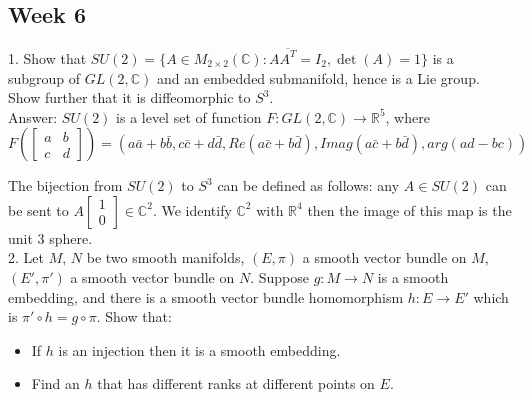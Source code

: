 \documentclass{article}
\theoremstyle{definition}
\begin{document}
\newpage

\subsection{Week 6}

1. Show that $SU(2)=\{A\in M_{2\times 2}(\mathbb{C}): A\overline{A^T}=I_2, \det(A)=1\}$ is a subgroup of $GL(2, \mathbb{C})$ and an embedded submanifold, hence is a Lie group. Show further that it is diffeomorphic to $S^3$.\\

Answer: $SU(2)$ is a level set of function $F: GL(2, \mathbb{C})\rightarrow \mathbb{R}^5$, where \[F(\left[\begin{array}{cc}a & b\\ c & d\end{array}\right])=(a\bar{a}+b\bar{b}, c\bar{c}+d\bar{d}, Re(a\bar{c}+b\bar{d}), Imag(a\bar{c}+b\bar{d}), arg(ad-bc))\]

The bijection from $SU(2)$ to $S^3$ can be defined as follows: any $A\in SU(2)$ can be sent to $A\left[\begin{array}{c}1\\0\end{array}\right]\in \mathbb{C}^2$. We identify $\mathbb{C}^2$ with $\mathbb{R}^4$ then the image of this map is the unit $3$ sphere.\\

2. Let $M$, $N$ be two smooth manifolds, $(E, \pi)$ a smooth vector bundle on $M$, $(E', \pi')$ a smooth vector bundle on $N$. Suppose $g: M\rightarrow N$ is a smooth embedding, and there is a smooth vector bundle homomorphism $h: E\rightarrow E'$ which is $\pi'\circ h=g\circ \pi$. Show that:

\begin{itemize}
    \item If $h$ is an injection then it is a smooth embedding.
    \item Find an $h$ that has different ranks at different points on $E$.
\end{itemize}
\end{document}
